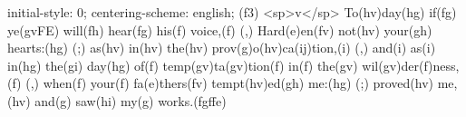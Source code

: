initial-style: 0;
centering-scheme: english;
(f3) <sp>v</sp> To(hv)day(hg) if(fg) ye(gvFE) will(fh) hear(fg) his(f) voice,(f) (,) Hard(e)en(fv) not(hv) your(gh) hearts:(hg) (;) as(hv) in(hv) the(hv) prov(g)o(hv)ca(ij)tion,(i) (,) and(i) as(i) in(hg) the(gi) day(hg) of(f) temp(gv)ta(gv)tion(f) in(f) the(gv) wil(gv)der(f)ness,(f) (,) when(f) your(f) fa(e)thers(fv) tempt(hv)ed(gh) me:(hg) (;) proved(hv) me,(hv) and(g) saw(hi) my(g) works.(fgffe)
